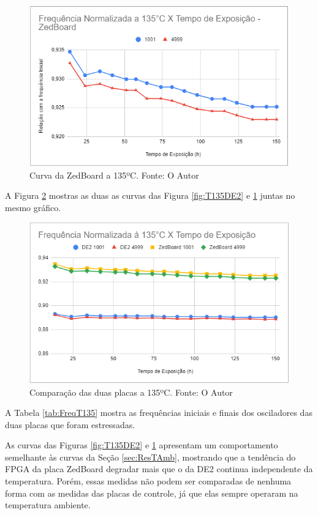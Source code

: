 \begin{figure}[H]
    \centering
    \includegraphics[scale=0.75]{figures/Resultados/T135ZedBoard}
    \caption{Curva da ZedBoard a 135ºC. Fonte: O Autor}
    \label{fig:T135ZedBoard}
\end{figure}

A Figura \ref{fig:T135Ambas} mostras as duas as curvas das Figura \ref{fig:T135DE2} e \ref{fig:T135ZedBoard} juntas no mesmo gráfico.

\begin{figure}[H]
    \centering
    \includegraphics[scale=0.75]{figures/Resultados/T135Ambas}
    \caption{Comparação das duas placas a 135ºC. Fonte: O Autor}
    \label{fig:T135Ambas}
\end{figure}

A Tabela \ref{tab:FreqT135} mostra as frequências iniciais e finais dos osciladores das duas placas que foram estressadas.



As curvas das Figuras \ref{fig:T135DE2} e \ref{fig:T135ZedBoard} apresentam um comportamento semelhante às curvas da Seção \ref{sec:ResTAmb}, mostrando que a tendência do FPGA da placa ZedBoard degradar mais que o da DE2 continua independente da temperatura. Porém, essas medidas não podem ser comparadas de nenhuma forma com as medidas das placas de controle, já que elas sempre operaram na temperatura ambiente.
